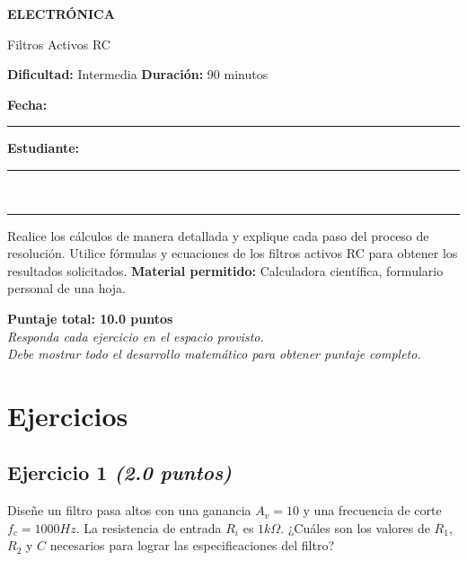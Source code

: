 \documentclass[11pt,a4paper]{article}
\newcommand{\bandaTitulo}[2]{%
  \begin{tcolorbox}[enhanced, colback=bandaAzul, colframe=bandaAzul,
    boxrule=0pt, arc=0pt, outer arc=0pt, width=\linewidth,
    halign=center, valign=center,
    top=14pt, bottom=14pt, left=10pt, right=10pt]
    {\LARGE\bfseries\color{white}#1}\par\vspace{4pt}%
    {\small\color{white!78!black}#2}%
  \end{tcolorbox}\vspace{8pt}}
\begin{document}
\bandaTitulo{ELECTRÓNICA}{Filtros Activos RC}

\begin{center}
  \vspace{2pt}
  {\large \textbf{Dificultad:} Intermedia \hfill
   \textbf{Duración:} 90 minutos} \\[4pt]
  {\large \textbf{Fecha:} \rule{4cm}{0.2pt} \hfill
   \textbf{Estudiante:} \rule{6cm}{0.2pt}} \\[6pt]
  \rule{\linewidth}{0.2pt}
\end{center}

\vspace{4pt}
\begin{tcolorbox}[cajaInstrucciones, title={Instrucciones}]
Realice los cálculos de manera detallada y explique cada paso del proceso de resolución. Utilice fórmulas y ecuaciones de los filtros activos RC para obtener los resultados solicitados.
\medskip
\textbf{Material permitido:} Calculadora científica, formulario personal de una hoja.
\end{tcolorbox}

\vspace{4pt}
\begin{center}
  \begin{tcolorbox}[
    enhanced,
    colback=white, colframe=azulTitulo,
    width=0.6\linewidth,
    boxrule=1.5pt,
    halign=center, valign=center,
    top=4pt, bottom=4pt,
  ]
    \centering
    \textbf{Puntaje total: 10.0 puntos} \\
    \small\textit{Responda cada ejercicio en el espacio provisto. \\
    Debe mostrar todo el desarrollo matemático para obtener puntaje completo.}
  \end{tcolorbox}
\end{center}

\section*{Ejercicios}


\subsection*{Ejercicio 1 \normalfont\normalsize\textit{(2.0 puntos)}}
Diseñe un filtro pasa altos con una ganancia $A_v = 10$ y una frecuencia de corte $f_c = 1000 Hz$. La resistencia de entrada $R_i$ es $1 k\Omega$. ¿Cuáles son los valores de $R_1$, $R_2$ y $C$ necesarios para lograr las especificaciones del filtro?
\end{document}
